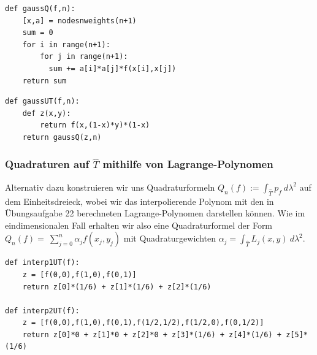 \lstset{language=Python}
\lstset{frame=lines}
\lstset{basicstyle=\footnotesize}
\begin{lstlisting}
def gaussQ(f,n):
    [x,a] = nodesnweights(n+1)
    sum = 0
    for i in range(n+1):
        for j in range(n+1):
          sum += a[i]*a[j]*f(x[i],x[j])
    return sum
\end{lstlisting}


\lstset{language=Python}
\lstset{frame=lines}
\lstset{basicstyle=\footnotesize}
\begin{lstlisting}
def gaussUT(f,n):
    def z(x,y):
        return f(x,(1-x)*y)*(1-x)
    return gaussQ(z,n)
\end{lstlisting}

\newline
\subsubsection{Quadraturen auf $\hat{T}$ mithilfe von Lagrange-Polynomen}
Alternativ dazu konstruieren wir uns Quadraturformeln $Q_{n}(f) := \int_{\hat{T}}p_{f}~d\lambda^{2}$ auf dem Einheitsdreieck, wobei wir das interpolierende Polynom mit den in Übungsaufgabe 22 berechneten Lagrange-Polynomen darstellen können. Wie im eindimensionalen Fall erhalten wir also eine Quadraturformel der Form $Q_{n}(f) =~\sum_{j=0}^{n}\alpha_{j}f(x_{j}, y_{j})$ mit Quadraturgewichten $\alpha_{j}=\int_{\hat{T}}L_{j}(x,y)~d\lambda^{2}$.

\lstset{language=Python}
\lstset{frame=lines}
\lstset{basicstyle=\footnotesize}
\begin{lstlisting}
def interp1UT(f):
    z = [f(0,0),f(1,0),f(0,1)]
    return z[0]*(1/6) + z[1]*(1/6) + z[2]*(1/6)

def interp2UT(f):
    z = [f(0,0),f(1,0),f(0,1),f(1/2,1/2),f(1/2,0),f(0,1/2)]
    return z[0]*0 + z[1]*0 + z[2]*0 + z[3]*(1/6) + z[4]*(1/6) + z[5]*(1/6)
\end{lstlisting}
\newline
\newline

